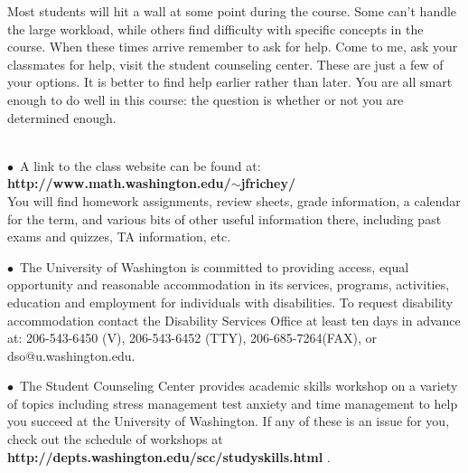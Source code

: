 \documentclass[11 pt]{report}
\begin{document}
\vspace{.25cm}  

 Most students will hit a wall at some point
during the course.  Some can't handle the large workload, while
others find difficulty with specific concepts in the course. When
these times arrive remember to ask for help.  Come to me, ask your classmates for help, visit the student counseling center.  These are just a
few of your options. It is better to find help earlier rather
than later. You are all smart enough to do well in this course: the
question is whether or not you are determined enough.
\vspace{0.3cm}

 \\
\noindent $\bullet$\ A link to the class website can be
found at: {\bf http://www.math.washington.edu/$\sim$jfrichey/} \\ You
will find homework assignments, review sheets, grade information, a
calendar for the term, and various bits of other useful information
there, including past exams and quizzes, TA information, etc.


\vspace{.2cm}


\noindent $\bullet$\ The University of Washington is committed to providing
access, equal opportunity and reasonable accommodation in its
services, programs, activities, education and employment for
individuals with disabilities.  To request disability accommodation
contact the Disability Services Office at least ten days in advance
at: 206-543-6450 (V), 206-543-6452 (TTY), 206-685-7264(FAX), or
dso@u.washington.edu.

\vspace{.2cm}

\noindent $\bullet$\  The Student Counseling Center provides academic skills
workshop on a variety of topics including stress management test
anxiety and time management to help you succeed at the University of
Washington. If any of these is an issue for you, check out the
schedule of workshops at {\bf
http://depts.washington.edu/scc/studyskills.html} .
\end{document}
